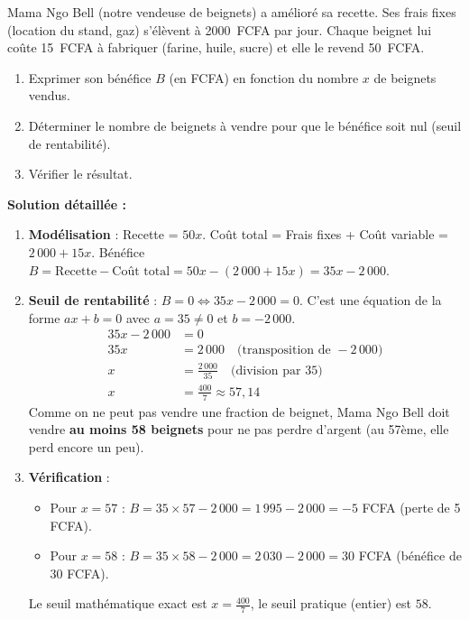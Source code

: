 \documentclass[11pt]{article}
\begin{document}
\begin{exoresolu}
Mama Ngo Bell (notre vendeuse de beignets) a amélioré sa recette. Ses frais fixes (location du stand, gaz) s'élèvent à \SI{2000}{FCFA} par jour. Chaque beignet lui coûte \SI{15}{FCFA} à fabriquer (farine, huile, sucre) et elle le revend \SI{50}{FCFA}.
\begin{enumerate}
    \item Exprimer son bénéfice $B$ (en FCFA) en fonction du nombre $x$ de beignets vendus.
    \item Déterminer le nombre de beignets à vendre pour que le bénéfice soit nul (seuil de rentabilité).
    \item Vérifier le résultat.
\end{enumerate}
\tcblower
\textbf{Solution détaillée :}
\begin{enumerate}
    \item \textbf{Modélisation} : Recette = $50x$. Coût total = Frais fixes + Coût variable = $2\,000 + 15x$.
    Bénéfice $B = \text{Recette} - \text{Coût total} = 50x - (2\,000 + 15x) = 35x - 2\,000$.
    \item \textbf{Seuil de rentabilité} : $B = 0 \Leftrightarrow 35x - 2\,000 = 0$.
    C'est une équation de la forme $ax + b = 0$ avec $a = 35 \neq 0$ et $b = -2\,000$.
    \begin{align*}
        35x - 2\,000 &= 0 \\
        35x &= 2\,000 \quad \text{(transposition de } -2\,000\text{)} \\
        x &= \frac{2\,000}{35} \quad \text{(division par } 35\text{)} \\
        x &= \frac{400}{7} \approx 57,14
    \end{align*}
    Comme on ne peut pas vendre une fraction de beignet, Mama Ngo Bell doit vendre \textbf{au moins 58 beignets} pour ne pas perdre d'argent (au 57ème, elle perd encore un peu).
    \item \textbf{Vérification} :
    \begin{itemize}
        \item Pour $x = 57$ : $B = 35 \times 57 - 2\,000 = 1\,995 - 2\,000 = -5$ FCFA (perte de 5 FCFA).
        \item Pour $x = 58$ : $B = 35 \times 58 - 2\,000 = 2\,030 - 2\,000 = 30$ FCFA (bénéfice de 30 FCFA).
    \end{itemize}
    Le seuil mathématique exact est $x = \frac{400}{7}$, le seuil pratique (entier) est $58$.
\end{enumerate}
\end{exoresolu}
\end{document}
